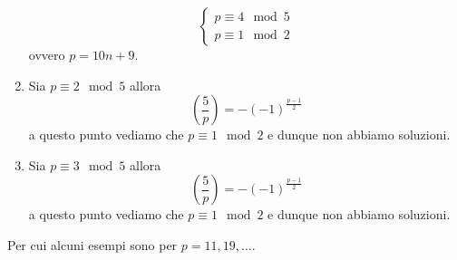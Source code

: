 \begin{esercizio}
\begin{enumerate}
			\begin{equation*}
				\begin{cases}
					p \equiv 4 \mod 5 \\
					p \equiv 1 \mod 2
				\end{cases}
			\end{equation*}
			ovvero $p = 10n + 9$.
		\item Sia $p \equiv 2 \mod 5$ allora 
			\begin{equation*}
				\left(\frac{5}{p}\right) = -(-1)^{\frac{p-1}{2}}
			\end{equation*}
			a questo punto vediamo che $p \equiv 1 \mod 2$ e dunque non
			abbiamo soluzioni.
		\item Sia $p \equiv 3 \mod 5$ allora 
			\begin{equation*}
				\left(\frac{5}{p}\right) = -(-1)^{\frac{p-1}{2}}
			\end{equation*}
			a questo punto vediamo che $p \equiv 1 \mod 2$ e dunque non
			abbiamo soluzioni.
	\end{enumerate}
	Per cui alcuni esempi sono per $p = 11, 19, \dots$.
\end{esercizio}


